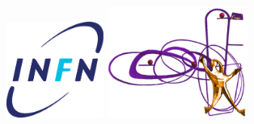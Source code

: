 \documentclass[final]{beamer}
\begin{document}
\begin{frame}{}
\begin{textblock}{30}
\begin{minipage}[t]{20cm}
      \hspace{10pt}
      \includegraphics[width=90pt]{figures/infn}
      \hspace{10pt}
      \includegraphics[width=130pt]{figures/fisicalogo}
    \end{minipage}\hspace{-5pt}
    \begin{minipage}[t]{15cm}
    \vspace{30pt}
      

\end{minipage}
\end{textblock}
\end{frame}
\end{document}
